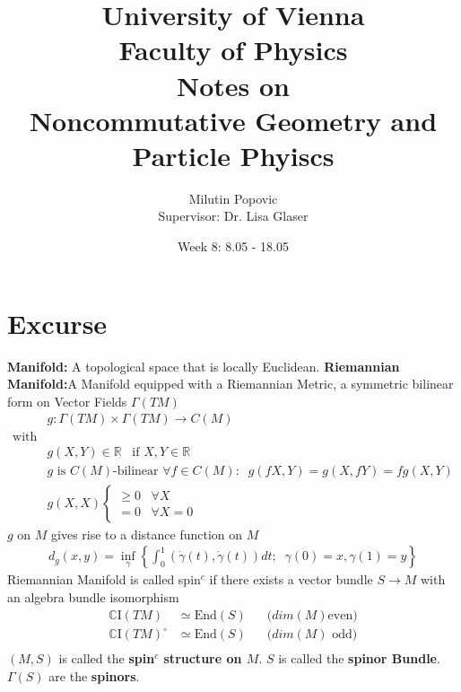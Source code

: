 \documentclass[a4paper]{article}
\title{University of Vienna\\ Faculty of Physics\\ \vspace{1.25cm}
Notes on\\ Noncommutative Geometry and Particle Phyiscs}
\author{Milutin Popovic \\ Supervisor: Dr. Lisa
Glaser}
\date{Week 8: 8.05 - 18.05}
\theoremstyle{definition}
\theoremstyle{definition}
\theoremstyle{definition}
\theoremstyle{theorem}
\theoremstyle{theorem}
\theoremstyle{theorem}
\begin{document}
    \maketitle
    \tableofcontents
    \newpage

    \section{Excurse}
    \textbf{Manifold:} A topological space that is locally Euclidean.
    \newline
    \textbf{Riemannian Manifold:}A Manifold equipped with a Riemannian
    Metric, a
    symmetric bilinear form on Vector Fields $\Gamma(TM)$
    \begin{align}
        &g: \Gamma(TM) \times \Gamma(TM) \rightarrow C(M) \\
        \text{with}& \nonumber\\
        &g(X, Y) \in \mathbb{R} \;\;\; \text{if $X, Y \in \mathbb{R}$}\\
        &\text{$g$ is $C(M)$-bilinear } \forall f\in C(M):\;\; g(fX, Y) =
        g(X,
        fY) = fg(X,Y)\\
        &g(X,X) \begin{cases}\geq 0  \;\;\; \forall X \\ = 0 \;\;\; \forall X
            =0
        \end{cases}
    \end{align}
    $g$ on $M$ gives rise to a distance function on $M$
    \begin{align}
        d_g(x, y) = \inf_\gamma \left\{\int_0^1(\dot{\gamma}(t),
        \dot{\gamma}(t))dt;\;\; \gamma(0) = x, \gamma(1) = y \right\}
    \end{align}
    Riemannian Manifold is called spin$^c$ if there exists a vector bundle $S
    \rightarrow M$ with an algebra bundle isomorphism
    \begin{align}
        \mathbb{C}\text{I}(TM) &\simeq \text{End}(S)\;\;\; &\text{($dim(M)$
        even)}\\
        \mathbb{C}\text{I}(TM)^\circ &\simeq \text{End}(S)\;\;\;
        &\text{($dim(M)$ odd)}\\
    \end{align}
    $(M,S)$ is called the \textbf{spin$^c$ structure on $M$}.
    \newline
    $S$ is called the \textbf{spinor Bundle}.
    \newline
    $\Gamma(S)$ are the \textbf{spinors}.
\end{document}
